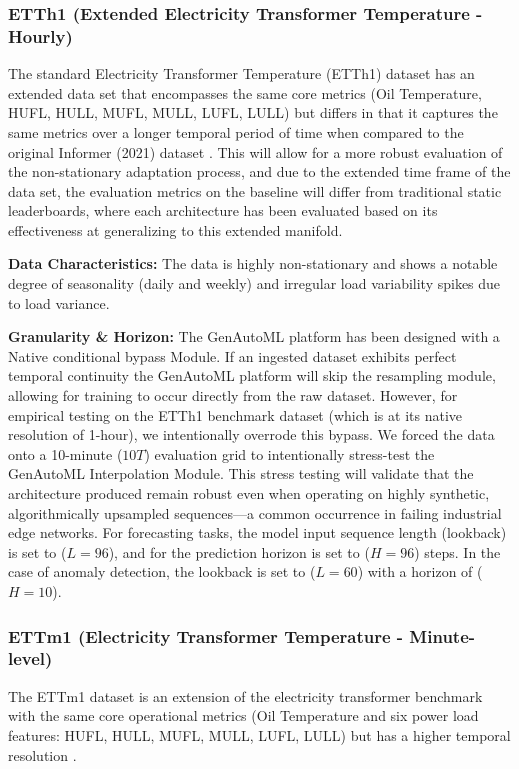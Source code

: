 \documentclass{article}
\begin{document}
\subsubsection{ETTh1 (Extended Electricity Transformer Temperature - Hourly)}
The standard Electricity Transformer Temperature (ETTh1) dataset has an extended data set that encompasses the same core metrics (Oil Temperature, HUFL, HULL, MUFL, MULL, LUFL, LULL) but differs in that it captures the same metrics over a longer temporal period of time when compared to the original Informer (2021) dataset \cite{zhou2021informer}. This will allow for a more robust evaluation of the non-stationary adaptation process, and due to the extended time frame of the data set, the evaluation metrics on the baseline will differ from traditional static leaderboards, where each architecture has been evaluated based on its effectiveness at generalizing to this extended manifold.



\textbf{Data Characteristics:} The data is highly non-stationary and shows a notable degree of seasonality (daily and weekly) and irregular load variability spikes due to load variance.

\textbf{Granularity \& Horizon:} The GenAutoML platform has been designed with a Native conditional bypass Module. If an ingested dataset exhibits perfect temporal continuity the GenAutoML platform will skip the resampling module, allowing for training to occur directly from the raw dataset. However, for empirical testing on the ETTh1 benchmark dataset (which is at its native resolution of 1-hour), we intentionally overrode this bypass. We forced the data onto a 10-minute ($10T$) evaluation grid to intentionally stress-test the GenAutoML Interpolation Module. This stress testing will validate that the architecture produced remain robust even when operating on highly synthetic, algorithmically upsampled sequences—a common occurrence in failing industrial edge networks. For forecasting tasks, the model input sequence length (lookback) is set to ($L=96$), and for the prediction horizon is set to ($H=96$) steps. In the case of anomaly detection, the lookback is set to ($L=60$) with a horizon of ($H=10$).

\subsubsection{ETTm1 (Electricity Transformer Temperature - Minute-level)}

The ETTm1 dataset is an extension of the electricity transformer benchmark with the same core operational metrics (Oil Temperature and six power load features: HUFL, HULL, MUFL, MULL, LUFL, LULL) but has a  higher temporal resolution \cite{zhou2021informer}.
\end{document}
